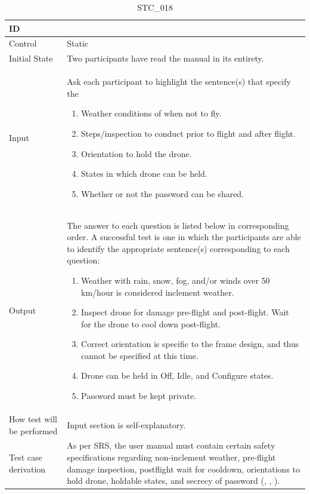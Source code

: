 \documentclass[12pt, titlepage]{article}
\begin{document}
\begin{table}[!h]
\begin{center}
\caption {STC\_018}
\label{tab:STC_018}
\begin{tabular}{ | m{3.2cm} | m{12.2cm} | } 
\hline
ID & \nameref{tab:STC_018} \\ 
\hline
Control & Static \\ 
\hline
Initial State & Two participants have read the manual in its entirety. \\ 
\hline
Input & Ask each participant to highlight the sentence(s) that specify the
\begin{enumerate}[topsep=0pt,itemsep=-1ex,partopsep=1ex,parsep=1ex]
        \item Weather conditions of when not to fly.
	\item Steps/inspection to conduct prior to flight and after flight.
	\item Orientation to hold the drone.
	\item States in which drone can be held.
        \item Whether or not the password can be shared.
\end{enumerate}
\\ 
\hline
Output & The answer to each question is listed below in corresponding order. A successful test is one in which the participants are able to identify the appropriate sentence(s) corresponding to each question: 
\begin{enumerate}[topsep=0pt,itemsep=-1ex,partopsep=1ex,parsep=1ex]
	\item Weather with rain, snow, fog, and/or winds over 50 km/hour is considered inclement weather.
	\item Inspect drone for damage pre-flight and post-flight. Wait for the drone to cool down post-flight.
	\item Correct orientation is specific to the frame design, and thus cannot be specified at this time.
	\item Drone can be held in Off, Idle, and Configure states.
    \item Password must be kept private.
\end{enumerate}\\ 
\hline
How test will be performed & Input section is self-explanatory. \\ 
\hline
Test case derivation & As per SRS, the user manual must contain certain safety specifications regarding non-inclement weather, pre-flight damage inspection, postflight wait for cooldown, orientations to hold drone, holdable states, and secrecy of password (\nameref{SR_002}, \nameref{SR_006}, \nameref{SR_010}). 
 \\ 
\hline
\end{tabular}
\end{center}
\end{table}
\end{document}
